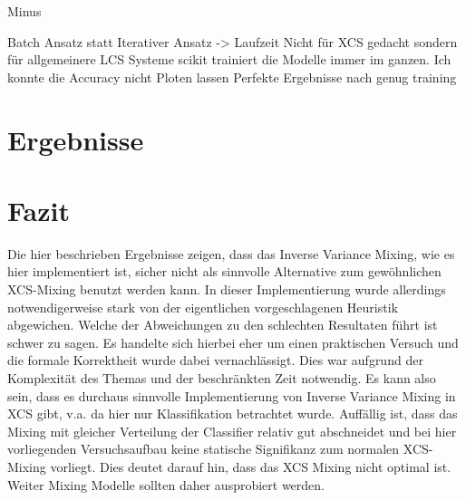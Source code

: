 \documentclass{ocsmnar}
\begin{document}
Minus 



Batch Ansatz statt Iterativer Ansatz -> Laufzeit
Nicht für XCS gedacht sondern für allgemeinere LCS Systeme 
scikit trainiert die Modelle immer im ganzen. Ich konnte die Accuracy nicht Ploten lassen
Perfekte Ergebnisse nach genug training 

\section{Ergebnisse}

\section{Fazit}
Die hier beschrieben Ergebnisse zeigen, dass das Inverse Variance Mixing, wie es hier implementiert ist, sicher nicht als sinnvolle Alternative zum gewöhnlichen XCS-Mixing benutzt werden kann. In dieser Implementierung wurde allerdings notwendigerweise stark von der eigentlichen vorgeschlagenen Heuristik abgewichen. Welche der Abweichungen zu den schlechten Resultaten führt ist schwer zu sagen. 
Es handelte sich hierbei eher um einen praktischen Versuch und die formale Korrektheit wurde dabei vernachlässigt. Dies war aufgrund der Komplexität des Themas und der beschränkten Zeit notwendig. Es kann also sein, dass es durchaus sinnvolle Implementierung von Inverse Variance Mixing in XCS gibt, v.a. da hier nur Klassifikation betrachtet wurde. 
Auffällig ist, dass das Mixing mit gleicher Verteilung der Classifier relativ gut abschneidet und bei hier vorliegenden Versuchsaufbau keine statische Signifikanz zum normalen XCS-Mixing vorliegt. Dies deutet darauf hin, dass das XCS Mixing nicht optimal ist. Weiter Mixing Modelle sollten daher ausprobiert werden.  















\end{document}
